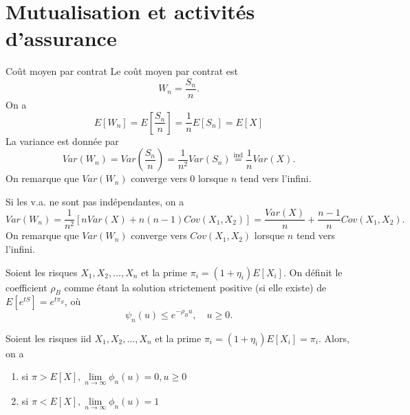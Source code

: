 \section{Mutualisation et activités d'assurance}

\begin{definition}{Coût moyen par contrat}{}
	Le coût moyen par contrat est 
	$$W_n = \frac{S_n}{n}.$$
	On a 
	$$E[W_n] = E\left[\frac{S_n}{n}\right] = \frac{1}{n}E[S_n] = E[X]$$
	La variance est donnée par 
	$$Var(W_n) = Var\left(\frac{S_n}{n}\right) = \frac{1}{n^2}Var(S_n) \stackrel{\text{ind}}{=} \frac{1}{n}Var(X).$$
	On remarque que $Var(W_n)$ converge vers 0 lorsque $n$ tend vers l'infini. 
\end{definition}

Si les v.a. ne sont pas indépendantes, on a 
$$Var(W_n) = \frac{1}{n^2}[nVar(X) + n(n-1) Cov(X_1, X_2)] = \frac{Var(X)}{n} + \frac{n-1}{n}Cov(X_1, X_2).$$
On remarque que $Var(W_n)$ converge vers $Cov(X_1, X_2)$ lorsque $n$ tend vers l'infini. 

\begin{proposition}{}{}
	Soient les risques $X_1, X_2, \dots, X_n$ et la prime $\pi_i = (1 + \eta_i)E[X_i]$. On définit le coefficient $\rho_B$ comme étant la solution strictement positive (si elle existe) de $E[e^{tS}] = e^{t\pi_S}$, où 
	$$\psi_n(u) \leq e^{-\rho_B u}, \quad u\geq 0.$$
\end{proposition}

\begin{proposition}{}{}
	Soient les risques iid $X_1, X_2, \dots, X_n$ et la prime $\pi_i = (1 + \eta_i)E[X_i] = \pi_i$. Alors, on a 
	\begin{enumerate}
		\item si $\pi > E[X], \lim\limits_{n \to \infty}\phi_n(u) = 0, u\geq 0$
		\item si $\pi < E[X], \lim\limits_{n \to \infty}\phi_n(u) = 1$
	\end{enumerate}
\end{proposition}












